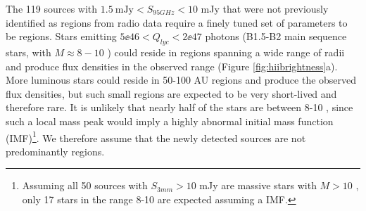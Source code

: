 \documentclass[twocolumn]{aastex61}
\begin{document}
The 119 sources with $1.5 \mathrm{~mJy} < S_{95 GHz} < 10$ mJy that were not
previously identified as \hii regions from radio data require a finely tuned set of
parameters to be \hii regions.  Stars emitting $5\ee{46} < Q_{lyc} < 2\ee{47}$
photons \pers (B1.5-B2 main sequence stars, with $M\approx8-10$ \msun) could
reside in \hii regions spanning a wide range of radii and produce flux
densities in the observed range (Figure \ref{fig:hiibrightness}a).  More
luminous stars could reside in 50-100 AU \hii regions and produce the observed
flux densities, but such small regions
are expected to be very short-lived and therefore rare.  It is unlikely that
nearly half of the stars are between 8-10 \msun, since such a local mass peak
would imply a highly abnormal initial mass function (IMF)\footnote{Assuming all 50 sources with
$S_{3mm}>10$ mJy are massive stars with $M>10$ \msun, only 17 stars in the range
8-10 \msun are expected assuming a \citet{Kroupa2001a} IMF.}.  We therefore
assume that the newly detected sources are not predominantly \hii regions.

\end{document}

